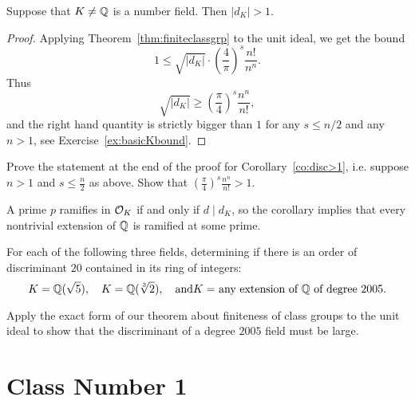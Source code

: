 \begin{corollary}\label{co:disc>1}
	Suppose that $K\neq \mathbb{Q}$ is a number field.  Then $|d_K|>1$.
\end{corollary}
\begin{proof}
	Applying Theorem~\ref{thm:finiteclassgrp} to the unit ideal,
	we get the bound
	$$
		 1\leq \sqrt{|d_K|}\cdot \left(\frac{4}{\pi}\right)^s\frac{n!}{n^n}.
	$$
	Thus
	$$
		\sqrt{|d_K|}
		\geq
		\left(\frac{\pi}{4}\right)^s\frac{n^n}{n!},
	$$
	and the right hand quantity is strictly bigger than $1$ for
	any $s\leq n/2$ and any $n>1$, see Exercise~\ref{ex:basicKbound}.
\end{proof}

\begin{exercise}\label{ex:basicKbound}
	Prove the statement at the end of the proof for Corollary~\ref{co:disc>1},
	i.e. suppose $n>1$ and $s\leq \frac{n}{2}$ as above. Show that
	$\left(\frac{\pi}{4}\right)^s\frac{n^n}{n!} > 1.$
\end{exercise}

A prime $p$ ramifies in $\mathcal{O}_K$ if and only if $d\mid d_K$,
so the corollary implies that every nontrivial extension of $\mathbb{Q}$
is ramified at some prime.

\begin{exercise}
	For each of the following three fields, determining if there is
	an order of discriminant $20$ contained in its ring of integers:
	$$
		K = \mathbb{Q}(\sqrt{5}), \quad K=\mathbb{Q}(\sqrt[3]{2}), \quad\text{and}
		\text{$K = $ any extension of $\mathbb{Q}$ of degree $2005$}.
	$$

	\begin{hint}
		Apply the exact form of our theorem about finiteness of class groups
		to the unit ideal to show that the discriminant of a degree $2005$
		field must be large.
	\end{hint}
\end{exercise}

\section{Class Number 1}\label{sec:cn1}

